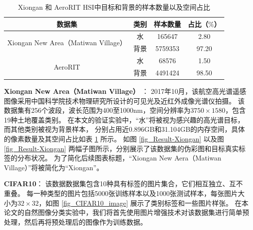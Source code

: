 \documentclass{xdupgthesis}
\begin{document}
\renewcommand{\arraystretch}{1.3}
\begin{table}[ht]
    \centering
    \caption{ Xiongan 和 AeroRIT HSI中目标和背景的样本数量以及空间占比}
    \label{tab_HSI-Water}
    \begin{tabular}{cccc}
        \toprule
        \toprule
            数据集 & 类别 & 样本数量 & 占比（$\%$）\\
        \midrule
            \multirow{2}{*}{Xiongan New Area（Matiwan Village）} & 水 & 165647 & 2.80 \\
             & 背景 & 5759353 & 97.20 \\
        \toprule
            \multirow{2}{*}{AeroRIT} & 水 & 68576 & 1.50 \\
            & 背景 & 4491424 & 98.50 \\
        \bottomrule
        \bottomrule
    \end{tabular}
\end{table}

\textbf{Xiongan New Area（Matiwan Village）} \cite{yi2020aerial}：
2017年10月，该航空高光谱遥感图像采用中国科学院技术物理研究所设计的可见光及近红外成像光谱仪拍摄。
该数据集有256个波段，波长范围为400至1000nm，空间分辨率为$3750\times1580$，包含19种土地覆盖类别。
在本文的验证实验中，“水”将被视为感兴趣的高光谱目标，而其他类别被视为背景样本，
分别占用近0.896GB和31.104GB的内存空间，具体的像素数量及其空间占比如表 \ref{tab_HSI-Water} 所示。
如图 \ref{fig_Result-Xiongan}  
以及图 \ref{fig_Result-Xiongan}  
两幅子图所示，分别展示了该数据集的伪彩图和目标真实标签的分布状况。
为了简化后续图表标题，“Xiongan New Aera（Matiwan Village）”将被简化为“Xiongan”。

\textbf{CIFAR10}：
该数据数据集包含10种具有标签的图片集合，它们相互独立、互不重叠。
每一种类型的图片包括5000张训练样本以及1000张测试样本，每张图片大小为$32\times32$，如图 \ref{fig_CIFAR10_image} 展示了类别标签和一些图片样张。
在本论文的自然图像分类实验中，我们将首先使用图片增强技术对该数据集进行简单预处理，然后再将预处理后的图像作为训练数据。
\end{document}
